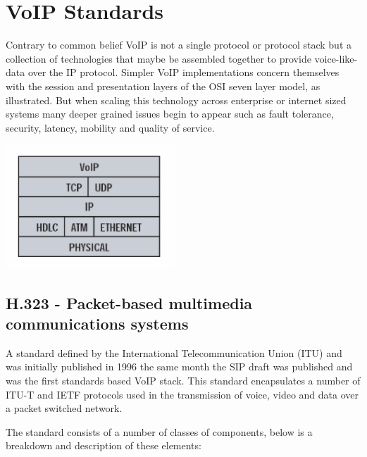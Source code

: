 \section{VoIP Standards}

Contrary to common belief VoIP is not a single protocol or protocol stack but a collection of technologies that maybe be assembled together to provide voice-like-data over the IP protocol. Simpler VoIP implementations concern themselves with the session and presentation layers of the OSI seven layer model, as illustrated. But when scaling this technology across enterprise or internet sized systems many deeper grained issues begin to appear such as fault tolerance, security, latency, mobility and quality of service.
\begin{center}
	\includegraphics[width=2.5in]{images/simple_voip_protocol.jpg}
\end{center}

\subsection{H.323 - Packet-based multimedia communications systems}
A standard defined by the International Telecommunication Union (ITU) and was initially published in 1996\cite{website:itu_h323} the same month the SIP draft was published and was the first standards based VoIP stack\cite{website:packetizer_h323}. This standard encapsulates a number of ITU-T and IETF protocols used in the transmission of voice, video and data over a packet switched network.

The standard consists of a number of classes of components, below is a breakdown and description of these elements:

